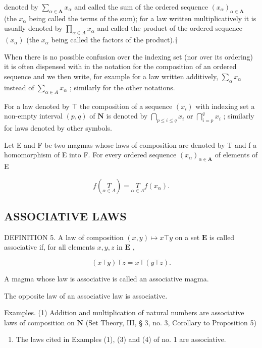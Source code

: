 denoted by \(\sum_{\alpha \in \mathbf{A}} x_{\alpha}\) and called the sum of the ordered sequence \((x_{\alpha})_{\alpha \in \mathbf{A}}\) (the \(x_{\alpha}\) being called the terms of the sum); for a law written multiplicatively it is usually denoted by \(\prod_{\alpha \in A} x_{\alpha}\) and called the product of the ordered sequence \((x_{\alpha})\) (the \(x_{\alpha}\) being called the factors of the product).†

When there is no possible confusion over the indexing set (nor over its ordering) it is often dispensed with in the notation for the composition of an ordered sequence and we then write, for example for a law written additively, \(\sum_{\alpha} x_{\alpha}\) instead of \(\sum_{\alpha \in A} x_{\alpha}\) ; similarly for the other notations.

For a law denoted by \(\top\) the composition of a sequence \((x_{i})\) with indexing set a non-empty interval \((p,q)\) of \(\mathbf{N}\) is denoted by \(\bigcap_{p\leqslant i\leqslant q}x_{i}\) or \(\bigcap_{i = p}^{q}x_{i}\) ; similarly for laws denoted by other symbols.

Let E and F be two magmas whose laws of composition are denoted by T and f a homomorphism of E into F. For every ordered sequence \((x_{\alpha})_{\alpha \in \mathbf{A}}\) of elements of E

\[
f \left(\underset {\alpha \in A} {T}\right) = \underset {\alpha \in A} {T} f (x _ {\alpha}).\tag{2}
\]

\subsection{ASSOCIATIVE LAWS}

DEFINITION 5. A law of composition \((x,y)\mapsto x\top y\) on a set \(\mathbf{E}\) is called associative if, for all elements \(x,y,z\) in \(\mathbf{E}\) ,

\[
(x \top y) \top z = x \top (y \top z).
\]

A magma whose law is associative is called an associative magma.

The opposite law of an associative law is associative.

Examples. (1) Addition and multiplication of natural numbers are associative laws of composition on \(\mathbf{N}\) (Set Theory, III, § 3, no. 3, Corollary to Proposition 5)

\begin{enumerate}
\def\labelenumi{(\arabic{enumi})}
\setcounter{enumi}{1}
\tightlist
\item
  The laws cited in Examples (1), (3) and (4) of no. 1 are associative.
\end{enumerate}

